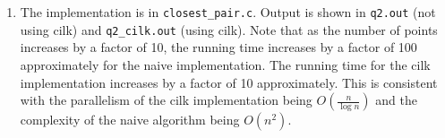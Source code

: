 \documentclass[11pt, letterpaper]{article}
\begin{document}
\begin{enumerate}
  \item The implementation is in \verb|closest_pair.c|. Output is shown in \verb|q2.out| (not using cilk) and \verb|q2_cilk.out| (using cilk). Note that as the number of points increases by a factor of 10, the running time increases by a factor of 100 approximately for the naive implementation. The running time for the cilk implementation increases by a factor of 10 approximately. This is consistent with the parallelism of the cilk implementation being $O(\frac{n}{\log n})$ and the complexity of the naive algorithm being $O(n^2)$. 
\end{enumerate}
\end{document}
